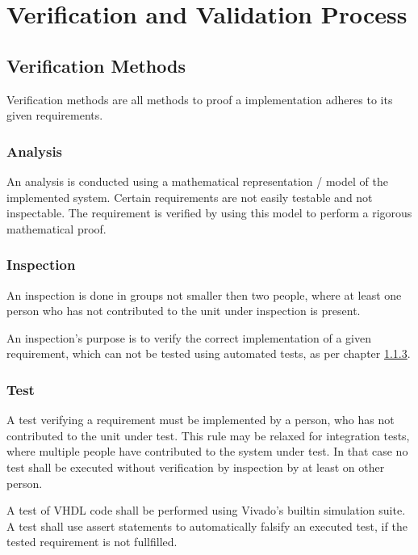 \chapter{Verification and Validation Process}

\section{Verification Methods}

Verification methods are all methods to proof a implementation adheres to its given requirements. 

\subsection{Analysis}

An analysis is conducted using a mathematical representation / model of the implemented system. Certain requirements are not easily testable and not inspectable. The requirement is verified by using this model to perform a rigorous mathematical proof.

\subsection{Inspection}

An inspection is done in groups not smaller then two people, where at least one person who has not contributed to the unit under inspection is present.

An inspection's purpose is to verify the correct implementation of a given requirement, which can not be tested using automated tests, as per chapter \ref{sec:Test}.

\subsection{Test}
\label{sec:Test}

A test verifying a requirement must be implemented by a person, who has not contributed to the unit under test. This rule may be relaxed for integration tests, where multiple people have contributed to the system under test. In that case no test shall be executed without verification by inspection by at least on other person.

A test of VHDL code shall be performed using Vivado's builtin simulation suite. A test shall use assert statements to automatically falsify an executed test, if the tested requirement is not fullfilled.

